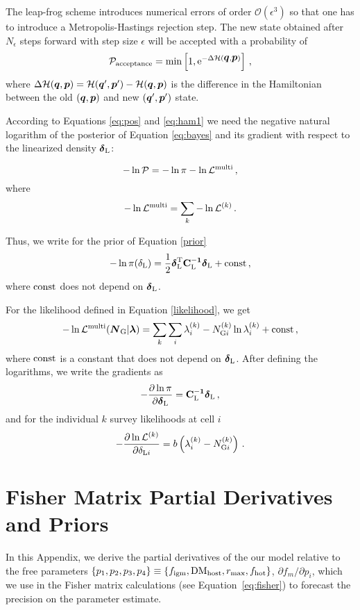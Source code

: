 \documentclass[twocolumn]{aastex63}
\newcommand{\mbi}[1]{\hbox{\boldmath{$#1$}}}
\newcommand{\mat}[1]{\ensuremath{\rm\bf #1}}
\newcommand{\be}{\begin{equation}}
\newcommand{\ee}{\end{equation}}
\newcommand{\ba}{\begin{eqnarray}}
\newcommand{\ea}{\end{eqnarray}}
\begin{document}
\begin{CJK*}{UTF8}{gbsn}
The leap-frog scheme introduces numerical errors of order $\mathcal{O}(\epsilon^3)$ so that one has to introduce a Metropolis-Hastings rejection step. The new state obtained after  $N_\epsilon$ steps forward with step size $\epsilon$ will be accepted with a  probability of
\ba
{\cal P}_{\rm acceptance}=\min\left[1,{\rm e}^{-\Delta \mathcal{H}(\mbi q,\mbi p)}\right]\,,
\ea
where  $\Delta \mathcal{H}(\mbi q,\mbi p)=\mathcal{H}(\mbi q',\mbi p')-\mathcal{H}(\mbi q,\mbi p)$ is the  difference in the Hamiltonian between the old $(\mbi q, \mbi p)$ and new $(\mbi q', \mbi p')$ state.


According to Equations \ref{eq:pos} and \ref{eq:ham1} we need the negative natural logarithm of the posterior of Equation \ref{eq:bayes} and its gradient with respect to the linearized density $\mbi \delta_{\rm L}$:

\be
\label{eq:posterior}
-\ln \mathcal{P} =-\ln \pi-\ln \mathcal{L}^{\rm multi} \, ,
\ee
where
\be
-\ln \mathcal{L}^{\rm multi} = \sum_k -\ln \mathcal{L}^{(k)}\, .
\ee

Thus, we write for the prior of Equation \ref{prior} 
\be
\label{lnprior}
-\ln \pi(\delta_{\rm L})=\frac{1}{2}\mbi \delta^{\rm T}_{\rm L}\mat C_{\rm L}^{-1}\mbi \delta_{\rm L}+\rm const\,,
\ee
where $\rm const$ does not depend on $\mbi \delta_{\rm L}$.

For the likelihood defined in Equation \ref{likelihood}, we get
\be
\label{lnlikelihood}
-\ln \mathcal{L}^{\rm multi} (\mbi{N}_{{\rm G}}\vert\mbi\lambda)=\sum_{k}\sum_{i}\lambda^{(k)}_{i}-{N}^{(k)}_{{\rm G}i}\ln\lambda^{(k)}_{i}+\rm const\,,
\ee
where $\rm const$ is a constant that does not depend on $\mbi \delta_{\rm L}$.
After defining the logarithms, we write the gradients as
\ba
\label{eq:grad1}
-\frac{\partial \ln \pi}{\partial \mbi\delta_{\rm L}}=\mat C_{\rm L}^{-1} \mbi\delta_{\rm L}\,,
\ea
and for the individual $k$ survey likelihoods at cell $i$
\ba
\label{eq:grad2}
-\frac{\partial \ln \mathcal{L}^{(k)}}{\partial \delta_{{\rm L} i}}=b\left(\lambda^{(k)}_{i}-{N}^{(k)}_{{\rm G}i}\right)\,.
\ea


\section{Fisher Matrix Partial Derivatives and Priors}
\label{app:fish_der}

In this Appendix, we derive the partial derivatives of the our model relative to the free parameters $ \{p_1, p_2, p_3, p_4\} \equiv \{f_{\rm igm}, {\rm DM_{host}}, r_{\rm max}, f_{\rm hot}\}$, $\partial f_m/\partial p_i$, which we use in the Fisher matrix calculations (see Equation~\ref{eq:fisher}) to forecast the precision on the  parameter estimate.


\end{CJK*}
\end{document}
